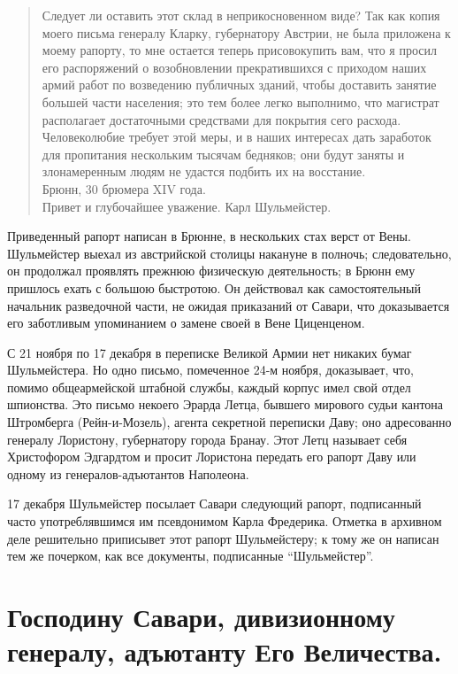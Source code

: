 \documentclass[
  oneside,
  12pt,
  titlepage]{book}
\begin{document}
\begin{quote}
Следует ли оставить этот склад в неприкосновенном виде? Так как копия моего письма генералу Кларку, губернатору Австрии, не была приложена к моему рапорту, то мне остается теперь присовокупить вам, что я просил его распоряжений о возобновлении прекратившихся с приходом наших армий работ по возведению публичных зданий, чтобы доставить занятие большей части населения; это тем более легко выполнимо, что магистрат располагает достаточными средствами для покрытия сего расхода.\\
Человеколюбие требует этой меры, и в наших интересах дать заработок для пропитания нескольким тысячам бедняков; они будут заняты и злонамеренным людям не удастся подбить их на восстание.\\
Брюнн, 30 брюмера XIV года.\\
Привет и глубочайшее уважение. Карл Шульмейстер.
\end{quote}

Приведенный рапорт написан в Брюнне, в нескольких стах верст от Вены. Шульмейстер выехал из австрийской столицы накануне в полночь; следовательно, он продолжал проявлять прежнюю физическую деятельность; в Брюнн ему пришлось ехать с большою быстротою. Он действовал как самостоятельный начальник разведочной части, не ожидая приказаний от Савари, что доказывается его заботливым упоминанием о замене своей в Вене Циценценом.

С 21 ноября по 17 декабря в переписке Великой Армии нет никаких бумаг Шульмейстера. Но одно письмо, помеченное 24-м ноября, доказывает, что, помимо общеармейской штабной службы, каждый корпус имел свой отдел шпионства. Это письмо некоего Эрарда Летца, бывшего мирового судьи кантона Штромберга (Рейн-и-Мозель), агента секретной переписки Даву; оно адресованно генералу Лористону, губернатору города Бранау. Этот Летц называет себя Христофором Эдгардтом и просит Лористона передать его рапорт Даву или одному из генералов-адъютантов Наполеона.

17 декабря Шульмейстер посылает Савари следующий рапорт, подписанный часто употреблявшимся им псевдонимом Карла Фредерика. Отметка в архивном деле решительно приписывет этот рапорт Шульмейстеру; к тому же он написан тем же почерком, как все документы, подписанные ``Шульмейстер''.

\hypertarget{ux433ux43eux441ux43fux43eux434ux438ux43dux443-ux441ux430ux432ux430ux440ux438-ux434ux438ux432ux438ux437ux438ux43eux43dux43dux43eux43cux443-ux433ux435ux43dux435ux440ux430ux43bux443-ux430ux434ux44aux44eux442ux430ux43dux442ux443-ux435ux433ux43e-ux432ux435ux43bux438ux447ux435ux441ux442ux432ux430.}{%
\section{Господину Савари, дивизионному генералу, адъютанту Его Величества.}\label{ux433ux43eux441ux43fux43eux434ux438ux43dux443-ux441ux430ux432ux430ux440ux438-ux434ux438ux432ux438ux437ux438ux43eux43dux43dux43eux43cux443-ux433ux435ux43dux435ux440ux430ux43bux443-ux430ux434ux44aux44eux442ux430ux43dux442ux443-ux435ux433ux43e-ux432ux435ux43bux438ux447ux435ux441ux442ux432ux430.}}
\end{document}
